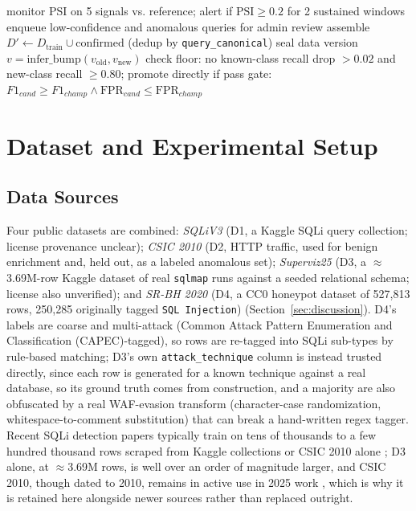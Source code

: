 \documentclass[conference]{IEEEtran}
\begin{document}
\begin{algorithm}[htbp]
\footnotesize
\caption{Continual-learning loop (offline, Branch 1)}
\label{alg:cl}
\begin{algorithmic}[1]
\STATE monitor PSI on 5 signals vs. reference; alert if $\text{PSI} \geq 0.2$
\STATE \hspace*{1em}for 2 sustained windows 
\STATE enqueue low-confidence and anomalous queries for admin review
\STATE assemble $D' \leftarrow D_{\text{train}} \cup \text{confirmed}$
\STATE \hspace*{1em}(dedup by \texttt{query\_canonical})
\STATE seal data version $v=\text{infer\_bump}(v_{\text{old}}, v_{\text{new}})$
\STATE check floor: no known-class recall drop $>0.02$
\STATE \hspace*{1em}and new-class recall $\geq 0.80$; promote directly if pass
\ELSE
\STATE gate: $F1_{cand} \geq F1_{champ} \land \text{FPR}_{cand} \leq \text{FPR}_{champ}$
\STATE \hspace*{1em}
\ENDIF
\ENDIF
\ENDWHILE
\end{algorithmic}
\end{algorithm}

\section{Dataset and Experimental Setup}\label{sec:setup}

\subsection{Data Sources}
Four public datasets are combined: \emph{SQLiV3} (D1, a Kaggle SQLi query collection; license provenance unclear); \emph{CSIC 2010} (D2, HTTP traffic, used for benign enrichment and, held out, as a labeled anomalous set); \emph{Superviz25} (D3, a $\approx$3.69M-row Kaggle dataset of real \texttt{sqlmap} runs against a seeded relational schema; license also unverified); and \emph{SR-BH 2020} (D4, a CC0 honeypot dataset of 527{,}813 rows, 250{,}285 originally tagged \texttt{SQL Injection}) (Section~\ref{sec:discussion}). D4's labels are coarse and multi-attack (Common Attack Pattern Enumeration and Classification (CAPEC)-tagged), so rows are re-tagged into SQLi sub-types by rule-based matching; D3's own \texttt{attack\_technique} column is instead trusted directly, since each row is generated for a known technique against a real database, so its ground truth comes from construction, and a majority are also obfuscated by a real WAF-evasion transform (character-case randomization, whitespace-to-comment substitution) that can break a hand-written regex tagger. Recent SQLi detection papers typically train on tens of thousands to a few hundred thousand rows scraped from Kaggle collections or CSIC 2010 alone \cite{b14,b15}; D3 alone, at $\approx$3.69M rows, is well over an order of magnitude larger, and CSIC 2010, though dated to 2010, remains in active use in 2025 work \cite{b15}, which is why it is retained here alongside newer sources rather than replaced outright.
\end{document}
